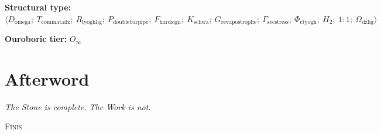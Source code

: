 \documentclass[12pt,a4paper]{article}
\begin{document}

\newpage

\textbf{Structural type:} $\langle D_{\text{omega}};\ T_{\text{commatailz}};\ R_{\text{lyoghlig}};\ P_{\text{doublebarpipe}};\ F_{\text{hardsign}};\ K_{\text{schwa}};\ G_{\text{revapostrophe}};\ \Gamma_{\text{secstress}};\ \Phi_{\text{ctyogh}};\ H_2;\ 1{:}1;\ \Omega_{\text{dzlig}} \rangle$

\textbf{Ouroboric tier:} $O_\infty$

\section*{Afterword}

\emph{The Stone is complete. The Work is not.}

\vspace{2em}
\noindent\textsc{Finis}
\end{document}
